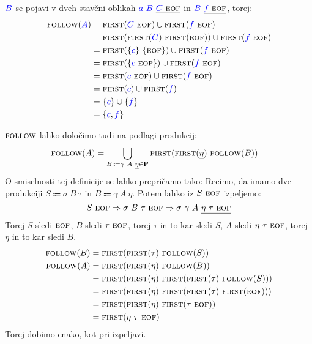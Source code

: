 \documentclass{article}
\newcommand{\FIRST}{\textsc{first}}
\newcommand{\FOLLOW}{\textsc{follow}}
\newcommand{\EOF}{\textsc{eof}}
\newcommand{\Set}[1]{\mathbf{#1}}
\newcommand{\Symbol}[1]{\textcolor{blue}{#1}}
\newcommand{\Productions}{\Set{P}}
\newcommand{\Arrow}{\Coloneq}
\newcommand{\Derive}{\Rightarrow}
\newcommand{\Seq}{\ }
\begin{document}
$\Symbol{B}$ se pojavi v dveh stavčni oblikah $\Symbol{a} \Seq \Symbol{B} \Seq \underline{\Symbol{C} \Seq \EOF}$ in $\Symbol{B} \Seq \underline{\Symbol{f} \Seq \EOF}$, torej:
\begin{align*}
  \FOLLOW(\Symbol{A}) &= \FIRST(\Symbol{C} \Seq \EOF) \cup \FIRST(\Symbol{f} \Seq \EOF)\\
             &= \FIRST(\FIRST(\Symbol{C}) \Seq \FIRST(\EOF)) \cup \FIRST(\Symbol{f} \Seq \EOF)\\
             &= \FIRST(\{\Symbol{c}\} \Seq \{\EOF\}) \cup \FIRST(\Symbol{f} \Seq \EOF)\\
             &= \FIRST(\{\Symbol{c} \Seq \EOF\}) \cup \FIRST(\Symbol{f} \Seq \EOF)\\
             &= \FIRST(\Symbol{c} \Seq \EOF) \cup \FIRST(\Symbol{f} \Seq \EOF)\\
             &= \FIRST(\Symbol{c}) \cup \FIRST(\Symbol{f})\\
             &= \{\Symbol{c}\} \cup \{\Symbol{f}\}\\
             &= \{\Symbol{c}, \Symbol{f}\}
\end{align*}

$\FOLLOW$ lahko določimo tudi na podlagi produkcij:
\begin{align*}
  \FOLLOW(A) &= \bigcup_{B \Arrow \gamma \Seq A \Seq \underline{\eta} \in \Productions} \FIRST(\FIRST(\underline{\eta}) \Seq \FOLLOW(B))
\end{align*}
O smiselnosti tej definicije se lahko prepričamo tako:
Recimo, da imamo dve produkciji $S \Arrow \sigma \Seq B \Seq \tau$ in $B \Arrow \gamma \Seq A \Seq \eta$.
Potem lahko iz $S \Seq \EOF$ izpeljemo:
\begin{equation*}
  S \Seq \EOF \Derive \sigma \Seq B \Seq \tau \Seq \EOF \Derive \sigma \Seq \gamma \Seq A \Seq \underline{\eta \Seq \tau \Seq \EOF}
\end{equation*}
Torej $S$ sledi $\EOF$, $B$ sledi $\tau \Seq \EOF$, torej $\tau$ in to kar sledi $S$, $A$ sledi $\eta \Seq \tau \Seq \EOF$, torej $\eta$ in to kar sledi $B$.
\begin{align*}
  \FOLLOW(B) &= \FIRST(\FIRST(\tau) \Seq \FOLLOW(S))\\
  \FOLLOW(A) &= \FIRST(\FIRST(\eta) \Seq \FOLLOW(B))\\
   &= \FIRST(\FIRST(\eta) \Seq \FIRST(\FIRST(\tau) \Seq \FOLLOW(S)))\\
   &= \FIRST(\FIRST(\eta) \Seq \FIRST(\FIRST(\tau) \Seq \FIRST(\EOF)))\\
   &= \FIRST(\FIRST(\eta) \Seq \FIRST(\tau \Seq \EOF))\\
   &= \FIRST(\eta \Seq \tau \Seq \EOF)
\end{align*}
Torej dobimo enako, kot pri izpeljavi.
\end{document}

